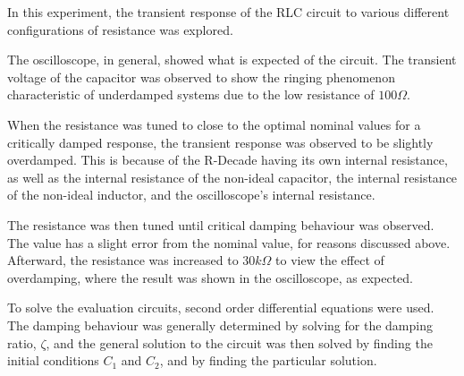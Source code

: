 In this experiment, the transient response of the RLC circuit to various different configurations of resistance was explored.

The oscilloscope, in general, showed what is expected of the circuit. The transient voltage of the capacitor was observed to show the ringing phenomenon characteristic of underdamped systems due to the low resistance of $100\Omega$.

When the resistance was tuned to close to the optimal nominal values for a critically damped response, the transient response was observed to be slightly overdamped. This is because of the R-Decade having its own internal resistance, as well as the internal resistance of the non-ideal capacitor, the internal resistance of the non-ideal inductor, and the oscilloscope's internal resistance.

The resistance was then tuned until critical damping behaviour was observed. The value has a slight error from the nominal value, for reasons discussed above. Afterward, the resistance was increased to $30k\Omega$ to view the effect of overdamping, where the result was shown in the oscilloscope, as expected.

To solve the evaluation circuits, second order differential equations were used. The damping behaviour was generally determined by solving for the damping ratio, $\zeta$, and the general solution to the circuit was then solved by finding the initial conditions $C_1$ and $C_2$, and by finding the particular solution.